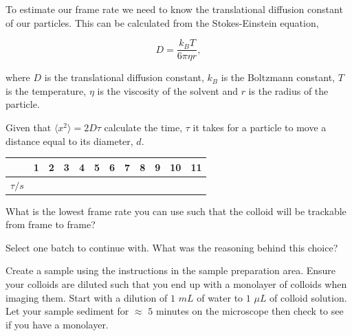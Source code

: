 \documentclass[12pt,a4paper,twoside]{article}
\begin{document}
To estimate our frame rate we need to know the translational diffusion constant of our particles. This can be calculated from the Stokes-Einstein equation,

\begin{equation}
    D = \frac{k_B T}{6 \pi \eta r},
\end{equation}

where $D$ is the translational diffusion constant, $k_B$ is the Boltzmann constant, $T$ is the temperature, $\eta$ is the viscosity of the solvent and $r$ is the radius of the particle.

Given that $\langle x^2 \rangle = 2 D \tau$ calculate the time, $\tau$ it takes for a particle to move a distance equal to its diameter, $d$.

\begin{center}    
    \begin{tabular}{ |c|c|c|c|c|c|c|c|c|c|c|c| } 
        \hline
        & 1 & 2 & 3 & 4 & 5 & 6 & 7 & 8 & 9 & 10 & 11\\
        \hline
        $\tau/s$ & \hspace{1cm}  &  \hspace{1cm}   &   \hspace{1cm}  & \hspace{1cm}   &   \hspace{1cm} &   \hspace{1cm} &  \hspace{1cm}  &   \hspace{1cm} &  \hspace{1cm}  &  \hspace{1cm}  &   \hspace{1cm} \\
        \hline
    \end{tabular}
\end{center}

What is the lowest frame rate you can use such that the colloid will be trackable from frame to frame?
\vspace{2cm}

Select one batch to continue with. What was the reasoning behind this choice?
\vspace{2cm}

Create a sample using the instructions in the sample preparation area. Ensure your colloids are diluted such that you end up with a monolayer of colloids when imaging them. Start with a dilution of $1$ $mL$ of water to $1$ $\mu L$ of colloid solution. Let your sample sediment for $\approx$ $5$ minutes on the microscope then check to see if you have a monolayer.
\end{document}
